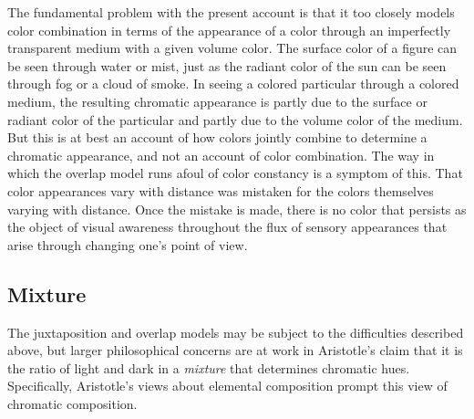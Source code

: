 The fundamental problem with the present account is that it too closely models color combination in terms of the appearance of a color through an imperfectly transparent medium with a given volume color. The surface color of a figure can be seen through water or mist, just as the radiant color of the sun can be seen through fog or a cloud of smoke. In seeing a colored particular through a colored medium, the resulting chromatic appearance is partly due to the surface or radiant color of the particular and partly due to the volume color of the medium. But this is at best an account of how colors jointly combine to determine a chromatic appearance, and not an account of color combination. The way in which the overlap model runs afoul of color constancy is a symptom of this. That color appearances vary with distance was mistaken for the colors themselves varying with distance. Once the mistake is made, there is no color that persists as the object of visual awareness throughout the flux of sensory appearances that arise through changing one's point of view.


\subsection{Mixture} %
\label{sub:mixture}

The juxtaposition and overlap models may be subject to the difficulties described above, but larger philosophical concerns are at work in Aristotle's claim that it is the ratio of light and dark in a \emph{mixture} that determines chromatic hues. Specifically, Aristotle's views about elemental composition prompt this view of chromatic composition.

